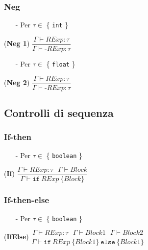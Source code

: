 \documentclass[12pt]{article}
\begin{document}
\subsubsection*{Neg}

\begin{center}
\begin{itemize}
\item[-] Per $\tau \in$ \{ \texttt{int} \}
\end{itemize}
\noindent(\textbf{Neg 1})
$\dfrac{\Gamma \vdash RExp:\tau}{\Gamma \vdash \texttt{-}RExp:\tau}$\\[0.1in]
\begin{itemize}
\item[-] Per $\tau \in$ \{ \texttt{float} \}
\end{itemize}
\noindent(\textbf{Neg 2})
$\dfrac{\Gamma \vdash RExp:\tau}{\Gamma \vdash \texttt{-}RExp:\tau}$
\end{center}

\subsection*{Controlli di sequenza}


\subsubsection*{If-then}
\begin{center}
\begin{itemize}
\item[-] Per $\tau \in$ \{ \texttt{boolean} \}
\end{itemize}
\noindent(\textbf{If})
$\dfrac{\Gamma \vdash RExp:\tau\ \ \ \Gamma \vdash Block}{\Gamma \vdash \texttt{if}\ RExp\ \{ Block\}}$\\[0.1in]
\end{center}

\subsubsection*{If-then-else}
\begin{center}
\begin{itemize}
\item[-] Per $\tau \in$ \{ \texttt{boolean} \}
\end{itemize}
\noindent(\textbf{IfElse})
$\dfrac{\Gamma \vdash RExp:\tau\ \ \ \Gamma \vdash Block1\ \ \ \Gamma \vdash Block2}{\Gamma \vdash \texttt{if}\ RExp\ \{ Block1\}\ \texttt{else}\ \{ Block1\}}$\\[0.1in]
\end{center}
\end{document}
